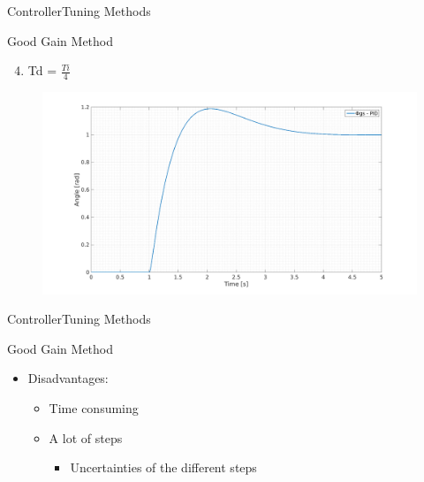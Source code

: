 \begin{frame}{Controller}{Tuning Methods}
  \begin{block}{Good Gain Method}
  
	  \begin{enumerate}
	  \setcounter{enumi}{3}
	  	\item Td = $\frac{Ti}{4}$
	  \end{enumerate}
	  \begin{figure}
       \includegraphics[scale=0.20]{../report/figures/GG4.png}
      \end{figure}
  
  \end{block}
\end{frame}


\begin{frame}{Controller}{Tuning Methods}
  \begin{block}{Good Gain Method}
  
	 \begin{itemize}
	  	\item Disadvantages:
	  \begin{itemize}
	  	\item Time consuming
	  	\item A lot of steps
	  	\begin{itemize}
	  	\item Uncertainties of the different steps	  	
	  	\end{itemize}

	  \end{itemize}
	\end{itemize}
  
  \end{block}
\end{frame}


